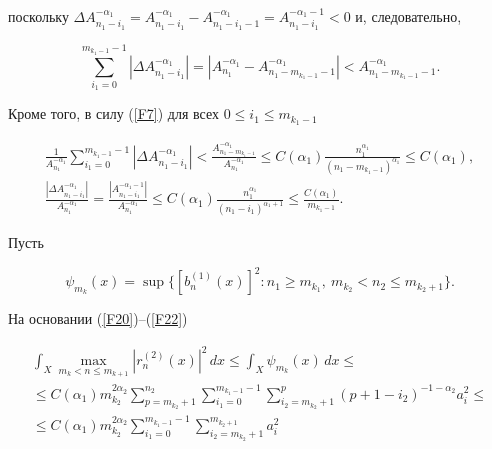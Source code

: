 поскольку $\Delta A_{n_1-i_1}^{-\alpha_1}=A_{n_1-i_1}^{-\alpha


_1}-A_{n_1-i_1-1}^{-\alpha_1}=A_{n_1-i_1}^{-\alpha_1 -1}<0$ и, следовательно,


$$


\sum_{i_1=0}^{m_{k_1-1}-1}|\Delta A_{n_1 -i_1}^{-\alpha_1}|=|A_{n_1}^{-\alpha


_1}-A_{n_1-m_{k_1-1}-1}^{-\alpha_1}|<A_{n_1-m_{k_1-1}-1}^{-\alpha_1}.


$$


Кроме того, в силу (\ref{F7}) для всех $0\le i_1 \le m_{k_1-1}$


\begin{gather*}


\frac{1}{A_{n_1}^{-\alpha_1}} \sum_{i_1=0}^{m_{k_1-1}-1} |\Delta


A_{n_1-i_1}^{-\alpha_1}|<\frac{A_{n_1-m_{k_1-1}}^{-\alpha_1}}


{A_{n_1}^{-\alpha_1}}\le C(\alpha_1)\frac{n_1^{\alpha_1}}


{(n_1-m_{k_1-1})^{\alpha_1}}\le C(\alpha_1), \\


%


\frac{|\Delta A_{n_1-i_1}^{-\alpha_1}|}{A_{n_1}^{-\alpha_1}}=


\frac{|A_{n_1-i_1}^{-\alpha_1-1}|}{A_{n_1}^{-\alpha_1}}\le


C(\alpha_1)\frac{n_1^{\alpha_1}}{(n_1-i_1)^{\alpha_1+1}}\le


\frac{C(\alpha_1)}{m_{k_1-1}}.


\end{gather*}


Пусть


\begin{equation}


\label{F22}


\psi_{m_k}(x)= \sup \{ [b_n^{(1)} (x)]^2: n_1\ge m_{k_1},\ m_{k_2}<n_2\le


m_{k_2+1} \} .


\end{equation}


На основании (\ref{F20})--(\ref{F22})


\begin{multline*}


\int_X \max_{m_k<n\le m_{k+1}} |r_n^{(2)}(x) |^2\,dx \le \int_X


\psi_{m_k}(x)\,dx \le \\


%


\le C(\alpha_1)m_{k_2}^{2\alpha_2}\sum_{p=m_{k_2}+1}^{n_2}


\sum_{i_1=0}^{m_{k_1-1}-1}\sum_{i_2=m_{k_2}+1}^p (p+1-i_2)^{-1-\alpha_2}


a_i^2 \le \\


%


\le C(\alpha_1)m_{k_2}^{2\alpha_2}\sum_{i_1=0}^{m_{k_1-1}-1}


\sum_{i_2=m_{k_2}+1}^{m_{k_2+1}}a_i^2


\end{multline*}


